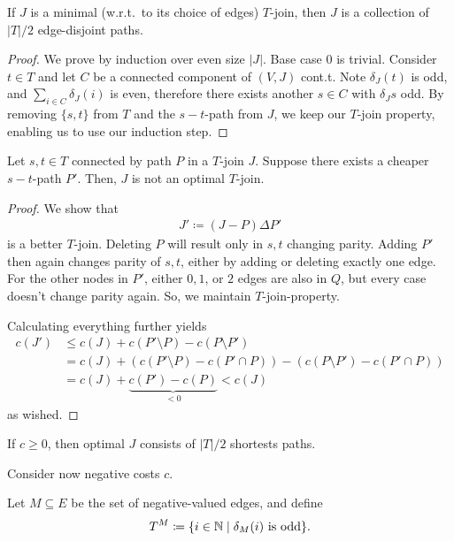 \begin{theorem}
    If $J$ is a minimal (w.r.t.\ to its choice of edges) $T$-join, then $J$ is a collection of $|T|/2$ edge-disjoint paths.
\end{theorem}
\begin{proof}
    We prove by induction over even size $|J|$. Base case $0$ is trivial.
    Consider $t \in T$ and let $C$ be a connected component of $(V,J)$ cont.t.
    Note $\delta_J(t)$ is odd, and $\sum_{i\in C}\delta_J(i)$ is even, therefore there exists
    another $s \in C$ with $\delta_J{s}$ odd.
    By removing $\{s,t\}$ from $T$ and the $s-t$-path from $J$, we keep our $T$-join property, enabling us to use our induction step.
\end{proof}
\begin{theorem}
    Let $s,t \in T$ connected by path $P$ in a $T$-join $J$. Suppose there exists a cheaper $s-t$-path $P'$.
    Then, $J$ is not an optimal $T$-join.
\end{theorem}
\begin{proof}
    We show that
    \begin{align*}
        J' \coloneqq (J - P) \Delta P'
    \end{align*}
    is a better $T$-join. Deleting $P$ will result only in $s,t$ changing parity.
    Adding $P'$ then again changes parity of $s,t$, either by adding or deleting exactly one edge.
    For the other nodes in $P'$, either $0,1$, or $2$ edges are also in $Q$, but every case doesn't change parity again.
    So, we maintain $T$-join-property.

    Calculating everything further yields
    \begin{align*}
        c(J') & \leq c(J) + c(P' \setminus P) - c(P \setminus P')                                \\
              & = c(J) + (c(P' \setminus P) - c(P' \cap P)) - (c(P \setminus P') - c(P' \cap P)) \\
              & = c(J) + \underbrace{c(P')-c(P)}_{<0}< c(J)
    \end{align*}
    as wished.
\end{proof}
\begin{corollary}
    If $c \geq 0$, then optimal $J$ consists of $|T|/2$ shortests paths.
\end{corollary}
Consider now negative costs $c$.
\begin{definition}
    Let $M \subseteq E$ be the set of negative-valued edges, and define
    \begin{align*}
        T^M \coloneqq  \{i \in \mathbb{N} \mid \delta_M(i) \text{ is odd}\}.
    \end{align*}
\end{definition}
